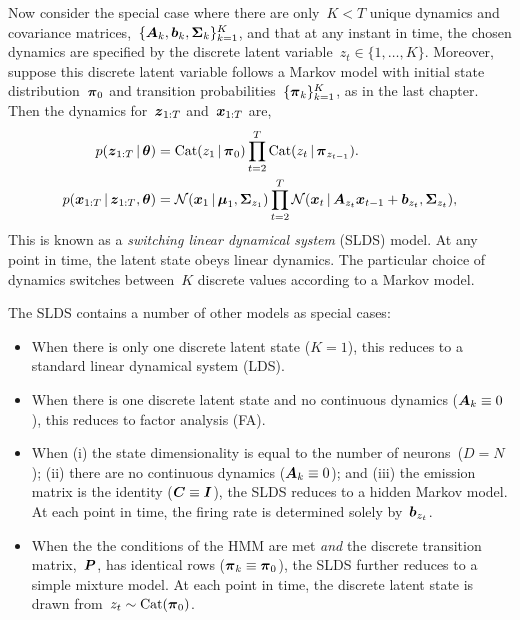 Now consider the special case where there are only~$K<T$ unique dynamics
and covariance matrices,~${\{\boldsymbol{A}_k, \boldsymbol{b}_k, \boldsymbol{\Sigma}_k\}_{k=1}^K}$, and that at
any instant in time, the chosen dynamics are specified by the
discrete latent variable~${z_t \in \{1, \ldots, K\}}$. Moreover,
suppose this discrete latent variable follows a Markov model with 
initial state distribution~$\boldsymbol{\pi}_0$ and transition probabilities~$\{\boldsymbol{\pi}_{k}\}_{k=1}^K$,
as in the last chapter. Then the dynamics for~$\boldsymbol{z}_{1:T}$ and~$\boldsymbol{x}_{1:T}$
are,
\begin{align*}
  p(\boldsymbol{z}_{1:T} \,|\, \boldsymbol{\theta}) 
  &=
    \mathrm{Cat}(z_1\,|\, \boldsymbol{\pi}_0)
    \prod_{t=2}^T \mathrm{Cat}(z_t \,|\, \boldsymbol{\pi}_{z_{t-1}}).
  \\
  p(\boldsymbol{x}_{1:T} \,|\, \boldsymbol{z}_{1:T}, \boldsymbol{\theta})
  &= 
    \mathcal{N}(\boldsymbol{x}_1 \,|\, \boldsymbol{\mu}_1, \boldsymbol{\Sigma}_{z_1})
    \prod_{t=2}^T \mathcal{N}(\boldsymbol{x}_t \,|\, \boldsymbol{A}_{z_t} \boldsymbol{x}_{t-1} + \boldsymbol{b}_{z_t}, \boldsymbol{\Sigma}_{z_t}),
\end{align*}
This is known as a \emph{switching linear dynamical system} (SLDS)
model. At any point in time, the latent state obeys linear dynamics.
The particular choice of dynamics switches between~$K$ discrete values
according to a Markov model.

The SLDS contains a number of other models as special cases:
\begin{itemize}
\item When there is only one discrete latent state ($K=1$), this
  reduces to a standard linear dynamical system (LDS).
  
\item When there is one discrete latent state and no continuous dynamics
  (${\boldsymbol{A}_k \equiv 0}$), this reduces to factor analysis (FA).

\item When (i) the state dimensionality is equal to the number of
  neurons~($D=N$); (ii) there are no continuous dynamics (${\boldsymbol{A}_k
    \equiv 0}$); and (iii) the emission matrix is the identity (${\boldsymbol{C}
    \equiv \boldsymbol{I}}$), the SLDS reduces to a hidden Markov model. At each
  point in time, the firing rate is determined solely
  by~$\boldsymbol{b}_{z_t}$.

\item When the the conditions of the HMM are met \emph{and} the
  discrete transition matrix,~$\boldsymbol{P}$, has identical rows (${\boldsymbol{\pi}_k
    \equiv \boldsymbol{\pi}_0}$), the SLDS further reduces to a simple mixture
  model. At each point in time, the discrete latent state is drawn
  from~${z_t \sim \mathrm{Cat}(\boldsymbol{\pi}_0)}$.
\end{itemize}

